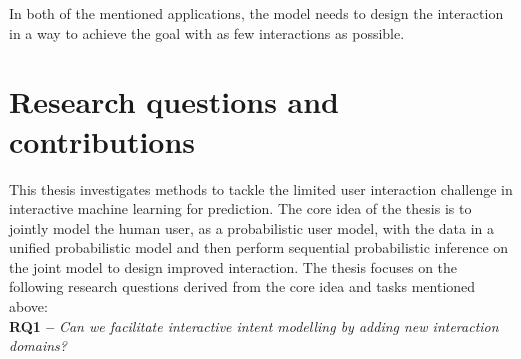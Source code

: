 \documentclass[dissertation,math,vertlayout,pdfa,colorlinks]{aaltoseries}
\begin{document}
In both of the mentioned applications, the model needs to design the interaction in a way to achieve the goal with as few interactions as possible.  





 
\section{Research questions and contributions}


This thesis investigates methods to tackle the limited user interaction challenge in interactive machine learning for prediction. %
The core idea of the thesis is to jointly model the human user, as a probabilistic user model, with the data in a unified probabilistic model and then perform sequential probabilistic inference on the joint model to design improved interaction.  The thesis focuses on the following research questions derived from the core idea and tasks mentioned above:\\

\noindent \textbf{RQ1 --} \textit{Can we facilitate interactive intent modelling by adding new interaction domains?}
\end{document}
